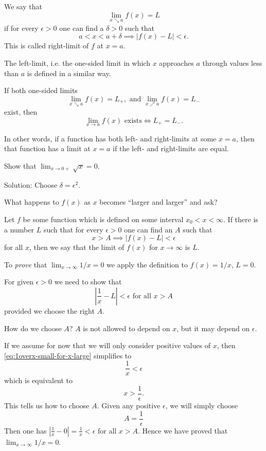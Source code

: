 \documentclass[../calc1-main.tex]{subfiles}
\begin{document}
\begin{definition}
  We say that
  \begin{equation}\label{eq:one-sided-lim-formulation}
    \lim_{x\searrow a} f(x) = L
  \end{equation}
  if for every $\epsilon>0$ one can find a $\delta>0$ such that
  \[
  a<x<a+\delta \implies |f(x)-L|<\epsilon.
  \]
  This is called right-limit of $f$ at $x=a$.
\end{definition}

The left-limit, i.e. the one-sided limit in which $x$ approaches $a$
through values less than $a$ is defined in a similar way.

\begin{theorem}
If both one-sided limits
\[
\lim_{x\searrow a} f(x) = L_{+}, \text{ and } \lim_{x\nearrow a} f(x) =
L_{-}
\]
exist, then
\[
\lim_{x\to a} f(x) \text{ exists} \iff L_{+}=L_{-}.
\]
\end{theorem}

In other words, if a function has both left- and right-limits at some
$x=a$, then that function has a limit at $x=a$ if the left- and
right-limits are equal.

\begin{example}
    Show that $\lim_{x \to 0+} \sqrt{x} = 0$.

    Solution: Choose $\delta = \epsilon^2$.
\end{example}

What happens to $f(x)$ as $x$ becomes ``larger and larger'' and ask?
\begin{definition}
  Let $f$ be some function which is defined on some interval $x_0<x<\infty$.
  If there is a number $L$ such that for every $\epsilon>0$ one can find
  an $A$ such that
  \[
  x>A \implies |f(x) - L| <\epsilon
  \]
  for all $x$, then we say that the limit of $f(x)$ for $x\to\infty$ is $L$.
\end{definition}

\begin{example}
  To \emph{prove} that $\lim_{x\to\infty}1/x = 0$ we apply the definition to
  $f(x) = 1/x$, $L=0$.

  For given $\epsilon>0$ we need to show that
  \begin{equation}\label{eq:1overx-small-for-x-large}
    \left|\frac1x - L\right|<\epsilon \text{ for all } x>A
  \end{equation}
  provided we choose the right $A$.

  How do we choose $A$?  $A$ is not allowed to depend on $x$, but it may
  depend on $\epsilon$.

  If we assume for now that we will only consider positive values of $x$,
  then \eqref{eq:1overx-small-for-x-large} simplifies to
  \[
  \frac 1x<\epsilon
  \]
  which is equivalent to
  \[
  x>\frac1\epsilon.
  \]
  This tells us how to choose $A$.  Given any positive $\epsilon$, we will
  simply choose
  \[
  A=\frac1\epsilon
  \]
  Then one has $|\frac1x-0| = \frac1x <\epsilon$ for all $x>A$.  Hence we
  have proved that $\lim_{x\to\infty}1/x=0$.
\end{example}
\end{document}
